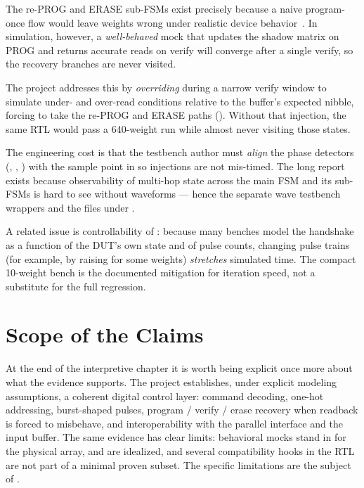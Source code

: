 The re-PROG and ERASE sub-FSMs exist precisely because a naive
program-once flow would leave weights wrong under realistic device
behavior~\cite{Sebastian2020IMC}. In simulation, however, a
\emph{well-behaved} mock that updates the shadow matrix on PROG and
returns accurate reads on verify will converge after a single verify,
so the recovery branches are never visited.

The project addresses this by \emph{overriding}
 during a narrow verify window to simulate
under- and over-read conditions relative to the buffer's expected
nibble, forcing  to take the re-PROG and ERASE paths
(). Without that injection, the same RTL
would pass a 640-weight run while almost never visiting those states.

The engineering cost is that the testbench author must \emph{align}
the phase detectors (, ,
) with the sample point in
 so injections are not mis-timed. The long report
exists because observability of multi-hop state across the main FSM
and its sub-FSMs is hard to see without waveforms --- hence the
separate wave testbench wrappers and the  files under
.

A related issue is controllability of : because many
benches model the handshake as a function of the DUT's own state and of
pulse counts, changing pulse trains (for example, by raising 
for some weights) \emph{stretches} simulated time. The compact 10-weight
bench is the documented mitigation for iteration speed, not a
substitute for the full regression.

\section{Scope of the Claims}
\label{sec:analysis-scope}

At the end of the interpretive chapter it is worth being explicit once
more about what the evidence supports. The project establishes, under
explicit modeling assumptions, a coherent digital control layer:
command decoding, one-hot addressing, burst-shaped pulses, program /
verify / erase recovery when readback is forced to misbehave, and
interoperability with the parallel interface and the input buffer. The
same evidence has clear limits: behavioral mocks stand in for the
physical array,  and  are
idealized, and several compatibility hooks in the RTL are not
part of a minimal proven subset. The specific limitations are the
subject of .
